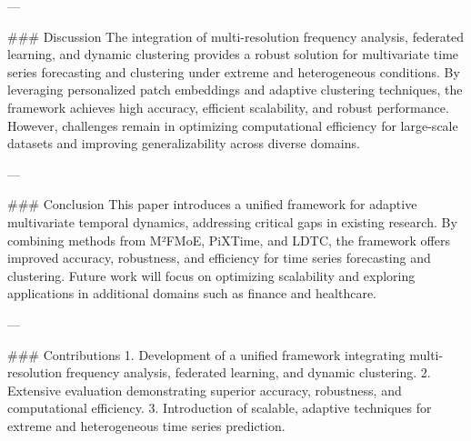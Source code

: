 ---

### Discussion  
The integration of multi-resolution frequency analysis, federated learning, and dynamic clustering provides a robust solution for multivariate time series forecasting and clustering under extreme and heterogeneous conditions. By leveraging personalized patch embeddings and adaptive clustering techniques, the framework achieves high accuracy, efficient scalability, and robust performance. However, challenges remain in optimizing computational efficiency for large-scale datasets and improving generalizability across diverse domains.

---

### Conclusion  
This paper introduces a unified framework for adaptive multivariate temporal dynamics, addressing critical gaps in existing research. By combining methods from M²FMoE, PiXTime, and LDTC, the framework offers improved accuracy, robustness, and efficiency for time series forecasting and clustering. Future work will focus on optimizing scalability and exploring applications in additional domains such as finance and healthcare.

---

### Contributions  
1. Development of a unified framework integrating multi-resolution frequency analysis, federated learning, and dynamic clustering.  
2. Extensive evaluation demonstrating superior accuracy, robustness, and computational efficiency.  
3. Introduction of scalable, adaptive techniques for extreme and heterogeneous time series prediction.

